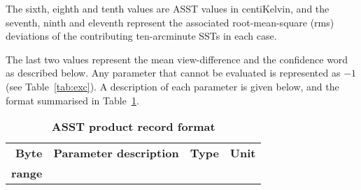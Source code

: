 The sixth, eighth and tenth values are ASST values in centiKelvin,
and the seventh, ninth and eleventh represent the associated 
root-mean-square (rms) deviations of the contributing ten-arcminute SSTs in each
case.

The last two values represent the mean view-difference and the confidence 
word as described below.
Any parameter that cannot be evaluated is represented as $-1$ 
(see Table~\ref{tab:exc}). 
A description of each parameter is given below, and the format summarised
in Table~\ref{tab:record}.

\begin{table}
\begin{center}
\caption{\bf ASST product record format }
\label{tab:record}
\begin{tabular}{|r|l|l|l|} \hline

{\bf Byte } & {\bf Parameter description} & {\bf Type} & {\bf Unit} \\ 
{\bf range} & & & \\ \hline \hline


\end{tabular}
\end{center}
\end{table}
